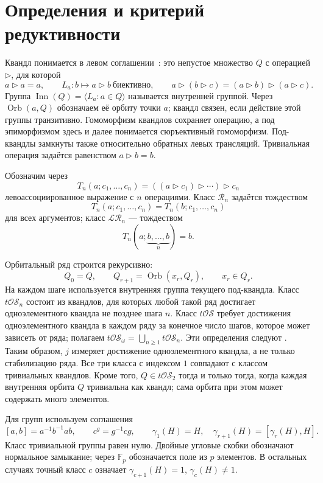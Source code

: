 \documentclass[11pt,a4paper]{article}
\theoremstyle{definition}
\theoremstyle{remark}
\newcommand{\R}{\mathcal R}
\newcommand{\LR}{\mathcal{LR}}
\newcommand{\tOS}{t\mathcal{OS}}
\newcommand{\Inn}{\operatorname{Inn}}
\newcommand{\Orb}{\operatorname{Orb}}
\newcommand{\F}{\mathbb F}
\newcommand{\conj}{\triangleright}
\begin{document}
\section{Определения и критерий редуктивности}\label{sec:definitions}

Квандл понимается в левом соглашении~\cite{BCNW}:
это непустое множество \(Q\) с операцией \(\conj\), для которой
\[
 a\conj a=a,\qquad L_a:b\mapsto a\conj b\ \text{биективно},
 \qquad a\conj(b\conj c)=(a\conj b)\conj(a\conj c).
\]
Группа \(\Inn(Q)=\langle L_a:a\in Q\rangle\)
называется внутренней группой.
Через \(\Orb(a,Q)\) обозначаем её орбиту точки \(a\);
квандл связен, если действие этой группы транзитивно.
Гомоморфизм квандлов сохраняет операцию, а под эпиморфизмом
здесь и далее понимается сюръективный гомоморфизм.
Под-квандлы замкнуты также относительно обратных левых трансляций.
Тривиальная операция задаётся равенством \(a\conj b=b\).

Обозначим через
\[
 T_n(a;c_1,\ldots,c_n)
 =((a\conj c_1)\conj\cdots)\conj c_n
\]
левоассоциированное выражение с \(n\) операциями.
Класс \(\R_n\) задаётся тождеством
\[
 T_n(a;c_1,\ldots,c_n)=T_n(b;c_1,\ldots,c_n)
\]
для всех аргументов; класс \(\LR_n\) --- тождеством
\[
 T_n(a;\underbrace{b,\ldots,b}_{n})=b.
\]

Орбитальный ряд строится рекурсивно:
\[
 Q_0=Q,\qquad Q_{r+1}=\Orb(x_r,Q_r),\qquad x_r\in Q_r.
\]
На каждом шаге используется внутренняя группа текущего под-квандла.
Класс \(\tOS_n\) состоит из квандлов, для которых любой такой
ряд достигает одноэлементного квандла не позднее шага \(n\).
Класс \(\tOS\) требует достижения одноэлементного квандла
в каждом ряду за конечное число шагов, которое может зависеть от ряда;
полагаем \(\tOS_\omega=\bigcup_{n\ge1}\tOS_n\).
Эти определения следуют \cite[раздел~4.1]{BCNW}.
Таким образом, \(j\) измеряет достижение одноэлементного квандла,
а не только стабилизацию ряда.
Все три класса с индексом \(1\) совпадают с классом тривиальных квандлов.
Кроме того, \(Q\in\tOS_2\) тогда и только тогда, когда
каждая внутренняя орбита \(Q\) тривиальна как квандл;
сама орбита при этом может содержать много элементов.

Для групп используем соглашения
\[
 [a,b]=a^{-1}b^{-1}ab,\qquad c^g=g^{-1}cg,\qquad
 \gamma_1(H)=H,\quad \gamma_{r+1}(H)=[\gamma_r(H),H].
\]
Класс тривиальной группы равен нулю.
Двойные угловые скобки обозначают нормальное замыкание;
через \(\F_p\) обозначается поле из \(p\) элементов.
В остальных случаях точный класс \(c\) означает
\(\gamma_{c+1}(H)=1\), \(\gamma_c(H)\ne1\).
\end{document}
